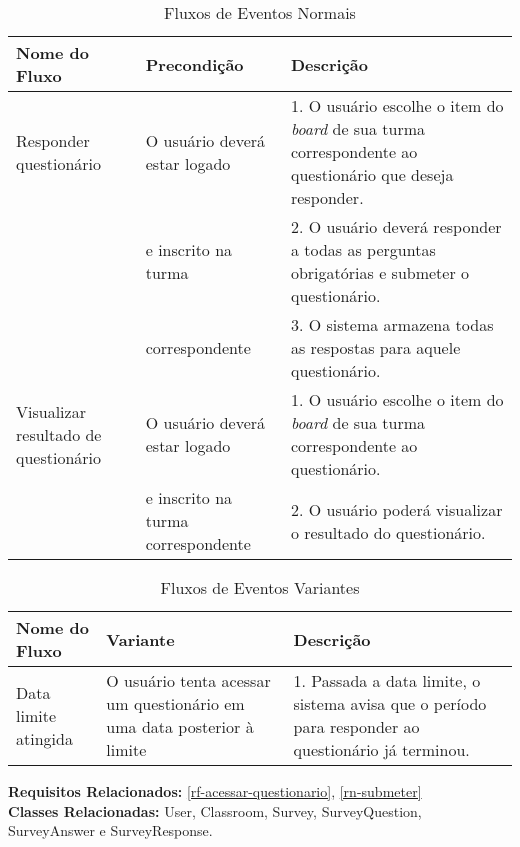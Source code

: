 \begin{table}[H]
	\centering \vspace{0.5cm} \footnotesize
	\caption{Fluxos de Eventos Normais}
	\begin{tabular}{|p{2.3cm}|p{2.5cm}|p{10cm}|} \hline  \rowcolor[rgb]{0.8,0.8,0.8}
		
		Nome do Fluxo & Precondição & Descrição  \\ \hline		
		
		Responder questionário & O usuário deverá estar logado & 1. O usuário escolhe o item do \textit{board} de sua turma correspondente ao questionário que deseja responder.  \\
		{}    &  e inscrito na turma  & 2. O usuário deverá responder a todas as perguntas obrigatórias e submeter o questionário. \\
		{}    & correspondente & 3. O sistema armazena todas as respostas para aquele questionário.\\ \hline 
		
		Visualizar resultado de questionário & O usuário deverá estar logado & 1. O usuário escolhe o item do \textit{board} de sua turma correspondente ao questionário.  \\
		{}    &  e inscrito na turma correspondente  & 2. O usuário poderá visualizar o resultado do questionário. \\ \hline 
		
		
	\end{tabular}
\end{table}

\begin{table}[H]
	\centering \vspace{0.5cm} \footnotesize
	\caption{Fluxos de Eventos Variantes}
	\begin{tabular}{|p{2.3cm}|p{2.5cm}|p{10.0cm}|} \hline  \rowcolor[rgb]{0.8,0.8,0.8}
		
		Nome do Fluxo & Variante & Descrição  \\ \hline		
		
		Data limite atingida & O usuário tenta acessar um questionário em uma data posterior à limite & 1. Passada a data limite, o sistema avisa que o período para responder ao questionário já terminou.  \\ \hline 
		
	\end{tabular}
\end{table}

\noindent  \textbf{Requisitos Relacionados:} \ref{rf-acessar-questionario}, \ref{rn-submeter}       \\ \textbf{Classes Relacionadas:} User, Classroom, Survey, SurveyQuestion, SurveyAnswer e SurveyResponse.

